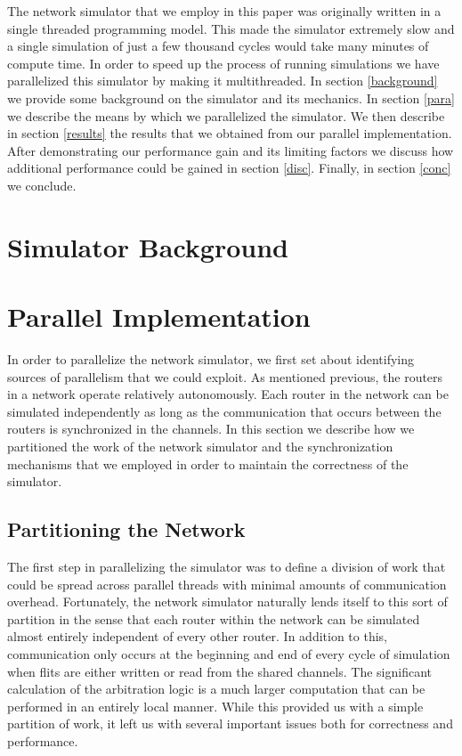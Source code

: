 \documentclass[twocolumn]{article}
\begin{document}
The network simulator that we employ in this paper was originally written
in a single threaded programming model.  This made the simulator extremely
slow and a single simulation of just a few thousand cycles would take many
minutes of compute time.  In order to speed up the process of running
simulations we have parallelized this simulator by making it
multithreaded.  In section \ref{background} we provide some background on
the simulator and its mechanics.  In section \ref{para} we describe the
means by which we parallelized the simulator.  We then describe in section
\ref{results} the results that we obtained from our parallel
implementation.  After demonstrating our performance gain and its limiting
factors we discuss how additional performance could be gained in section
\ref{disc}.  Finally, in section \ref{conc} we conclude.

\section{Simulator Background \label{background}}


\section{Parallel Implementation \label{para}}
In order to parallelize the network simulator, we first set about
identifying sources of parallelism that we could exploit.  As mentioned previous, the routers in a network operate relatively autonomously.   Each router in the network can be simulated
independently as long as the communication that occurs between the routers
is synchronized in the channels.  In this section we describe how we
partitioned the work of the network simulator and the synchronization
mechanisms that we employed in order to maintain the correctness of the simulator.

\subsection{Partitioning the Network}
The first step in parallelizing the simulator was to define a division of
work that could be spread across parallel threads with minimal amounts of
communication overhead.  Fortunately, the network simulator naturally
lends itself to this sort of partition in the sense that each router
within the network can be simulated almost entirely independent of every
other router.  In addition to this, communication only occurs at the
beginning and end of every cycle of simulation when flits are either
written or read from the shared channels.  The significant
calculation of the arbitration logic is a much larger computation that
can be performed in an entirely local manner.  While this provided us with
a simple partition of work, it left us with several important issues both
for correctness and performance.
\end{document}
